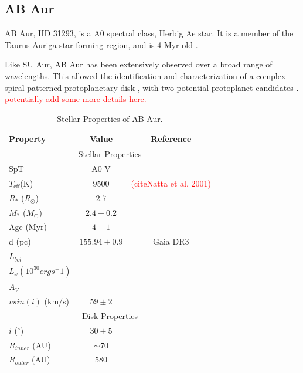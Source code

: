 \documentclass[twocolumn]{aastex631}
\renewcommand\deg{\ensuremath{^\circ}}
\newcommand{\teff}{\ensuremath{T_{\text{eff}}}}
\newcommand{\citesomething}[1]{\textcolor{red}{(cite#1)}}
\newcommand{\red}[1]{\textcolor{red}{#1}}
\begin{document}
\subsection{AB Aur}
AB Aur, HD 31293, is a A0 spectral class, Herbig Ae star. It is a member of the Taurus-Auriga star forming region, and is 4 Myr old \citep[e.g.][]{dewarf_intrinsic_2003}.

Like SU Aur, AB Aur has been extensively observed over a broad range of wavelengths. This  allowed the identification and characterization of a complex spiral-patterned protoplanetary disk \citep[e.g.][]{fukagawa_spiral_2004, pietu_sub_arcsec_2005, tang_circumstellar_2012}, with two potential protoplanet candidates \cite{boccaletti_possible_2020, jorquera_large_2022}. \red{potentially add some more details here.}

\begin{table}[ht!]
    \centering
    \begin{tabular}{|l|c|c|}
    \hline
    Property & Value & Reference \\
    \hline
    \multicolumn{3}{|c|}{Stellar Properties}\\
    \hline
    SpT                 & A0 V &  \\
    \teff (K)           & 9500 & \citesomething{Natta et al. 2001} \\ 
    $R_*$ ($R_\odot$)   & $2.7$ & \cite{dewarf_intrinsic_2003} \\
    $M_*$ ($M_\odot$)   & $2.4 \pm 0.2 $ & \cite{dewarf_intrinsic_2003} \\
    Age (Myr)           & $4 \pm 1$ & \cite{dewarf_intrinsic_2003}\\
    d (pc)              & $155.94 \pm 0.9$ & Gaia DR3\\
    $L_{bol}$           & & \\
    $L_x (10^{30} erg s^-{1})$ &  &  \\
    $A_V$               & & \\
    $vsin(i)$ (km/s)    & $59\pm2$ & \citet{nguyen_close_2012} \\
    \hline
    \multicolumn{3}{|c|}{Disk Properties} \\
    \hline
    $i$ (\deg) & $30\pm5$ & \citet{fukagawa_spiral_2004} \\
    $R_{inner}$ (AU) & $\sim 70$ &  \\
    $R_{outer}$ (AU) & $580$ & \citet{fukagawa_spiral_2004} \\
    \hline   
    \end{tabular}
    \caption{Stellar Properties of AB Aur.}
    \label{table:ab_aur_properties}
\end{table}
\end{document}
